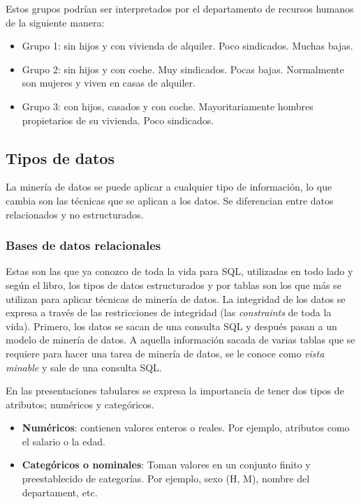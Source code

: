 \documentclass{article}
\begin{document}
Estos grupos podrían ser interpretados por el departamento de recursos humanos de la siguiente manera:
\begin{itemize}
\item Grupo 1: sin hijos y con vivienda de alquiler. Poco sindicados. Muchas bajas.
\item Grupo 2: sin hijos y con coche. Muy sindicados. Pocas bajas. Normalmente son mujeres y viven en casas de alquiler.
\item Grupo 3: con hijos, casados y con coche. Mayoritariamente hombres propietarios de su vivienda. Poco sindicados.
\end{itemize}


\subsection{Tipos de datos}

La minería de datos se puede aplicar a cualquier tipo de información, lo que cambia son las técnicas que se aplican a los datos. Se diferencian entre datos relacionados y no estructurados.

\subsubsection{Bases de datos relacionales}

Estas son las que ya conozco de toda la vida para SQL, utilizadas en todo lado y según el libro,
los tipos de datos estructurados y por tablas son los que más se utilizan para aplicar técnicas
de minería de datos. La integridad de los datos se expresa a través de las restricciones de
integridad (las \textit{constraints} de toda la vida). Primero, los datos se sacan de una
consulta SQL y después pasan a un modelo de minería de datos. A aquella información sacada de
varias tablas que se requiere para hacer una tarea de minería de datos, se le conoce como
\textit{vista minable} y sale de una consulta SQL.


En las presentaciones tabulares se expresa la importancia de tener dos tipos de atributos; numéricos y categóricos.
\begin{itemize}
  \item \textbf{Numéricos}: contienen valores enteros o reales. Por ejemplo, atributos como el salario o la edad.
  \item \textbf{Categóricos o nominales}: Toman valores en un conjunto finito y preestablecido de categorías. Por ejemplo, sexo (H, M), nombre del departament, etc.
\end{itemize}
\end{document}
